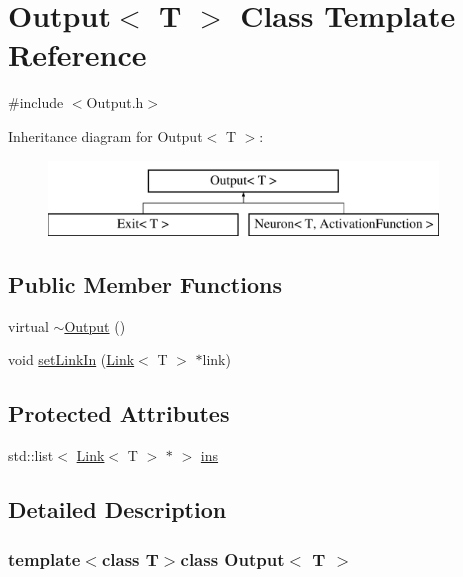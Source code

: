\hypertarget{class_output}{\section{\-Output$<$ \-T $>$ \-Class \-Template \-Reference}
\label{class_output}
}


{\ttfamily \#include $<$\-Output.\-h$>$}

\-Inheritance diagram for \-Output$<$ \-T $>$\-:\begin{figure}[H]
\begin{center}
\leavevmode
\includegraphics[height=2.000000cm]{class_output}
\end{center}
\end{figure}
\subsection*{\-Public \-Member \-Functions}
\begin{DoxyCompactItemize}
\item 
virtual \hyperlink{class_output_aebe365bb0c9844b5456e74f0fb1a0a35}{$\sim$\-Output} ()
\item 
void \hyperlink{class_output_afd26f81d178846371c17d63015f2eb9f}{set\-Link\-In} (\hyperlink{class_link}{\-Link}$<$ \-T $>$ $\ast$link)
\end{DoxyCompactItemize}
\subsection*{\-Protected \-Attributes}
\begin{DoxyCompactItemize}
\item 
std\-::list$<$ \hyperlink{class_link}{\-Link}$<$ \-T $>$ $\ast$ $>$ \hyperlink{class_output_ade68e41659b12f8a7e31f8dc8507bb50}{ins}
\end{DoxyCompactItemize}


\subsection{\-Detailed \-Description}
\subsubsection*{template$<$class \-T$>$class Output$<$ T $>$}

